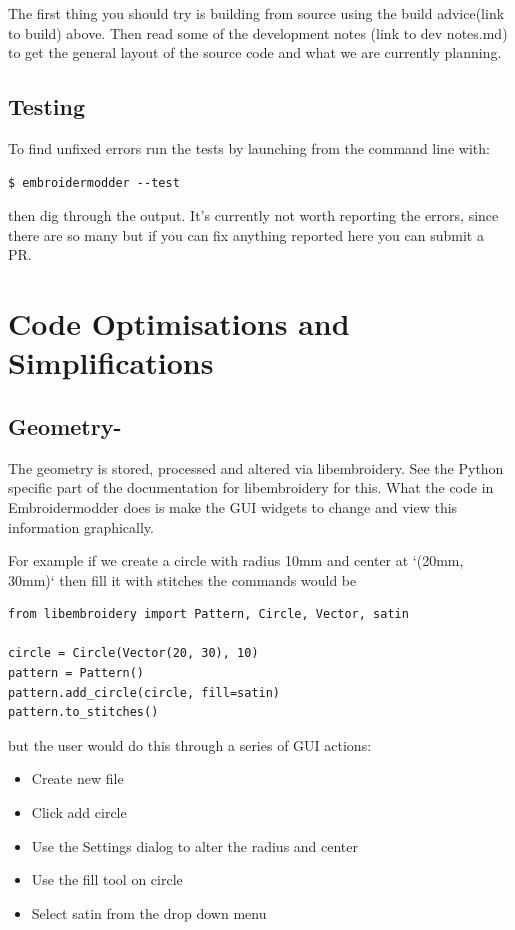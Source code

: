 \documentclass[10pt]{report}
\begin{document}
The first thing you should try is building from source using the build advice(link to build)
above. Then read some of the development notes (link to dev notes.md) to get the general
layout of the source code and what we are currently planning.

\subsection{Testing}

To find unfixed errors run the tests by launching from the command line with:

\begin{lstlisting}
$ embroidermodder --test
\end{lstlisting}

then dig through the output. It's currently not worth reporting the errors, since
there are so many but if you can fix anything reported here you can submit a PR.

\section{Code Optimisations and Simplifications}

\subsection{Geometry-}

The geometry is stored, processed and altered via libembroidery. See the Python specific part
of the documentation for libembroidery for this. What the code in Embroidermodder does is make
the GUI widgets to change and view this information graphically.

For example if we create a circle with radius 10mm and center at `(20mm, 30mm)` then fill it
with stitches the commands would be

\begin{lstlisting}
from libembroidery import Pattern, Circle, Vector, satin

circle = Circle(Vector(20, 30), 10)
pattern = Pattern()
pattern.add_circle(circle, fill=satin)
pattern.to_stitches()
\end{lstlisting}

but the user would do this through a series of GUI actions:

\begin{itemize}
\item Create new file
\item Click add circle
\item Use the Settings dialog to alter the radius and center
\item Use the fill tool on circle
\item Select satin from the drop down menu
\end{itemize}
\end{document}
